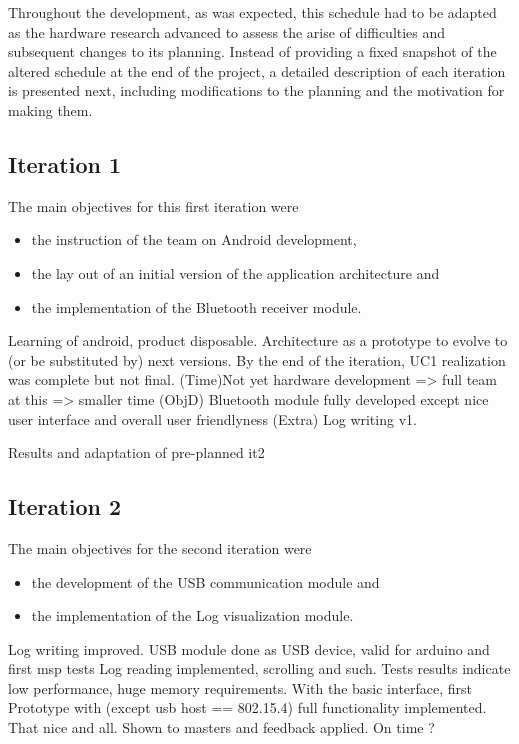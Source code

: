 			Throughout the development, as was expected, this schedule had to be adapted as the hardware research advanced to assess the arise of difficulties and subsequent changes to its planning. Instead of providing a fixed snapshot of the altered schedule at the end of the project, a detailed description of each iteration is presented next, including modifications to the planning and the motivation for making them.

		\subsection{Iteration 1}

			The main objectives for this first iteration were
			\begin{itemize} 
				\item the instruction of the team on Android development, 
				\item the lay out of an initial version of the application architecture and
				\item the implementation of the Bluetooth receiver module.
			\end{itemize}

			Learning of android, product disposable.
			Architecture as a prototype to evolve to (or be substituted by) next versions.
			By the end of the iteration, UC1 realization was complete but not final.
			(Time)Not yet hardware development => full team at this => smaller time
			(ObjD) Bluetooth module fully developed except nice user interface and overall user friendlyness
			(Extra) Log writing v1.

			Results and adaptation of pre-planned it2
			
		\subsection{Iteration 2}

			The main objectives for the second iteration were
			\begin{itemize} 
				\item the development of the USB communication module and
				\item the implementation of the Log visualization module.
			\end{itemize}

			Log writing improved.
			USB module done as USB device, valid for arduino and first msp tests
			Log reading implemented, scrolling and such. Tests results indicate low performance, huge memory requirements.
			With the basic interface, first Prototype with (except usb host == 802.15.4) full functionality implemented. That nice and all. Shown to masters and feedback applied.
			On time ?

